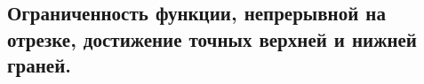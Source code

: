 \subsection{Ограниченность функции, непрерывной на отрезке, достижение точных верхней и нижней граней.}
